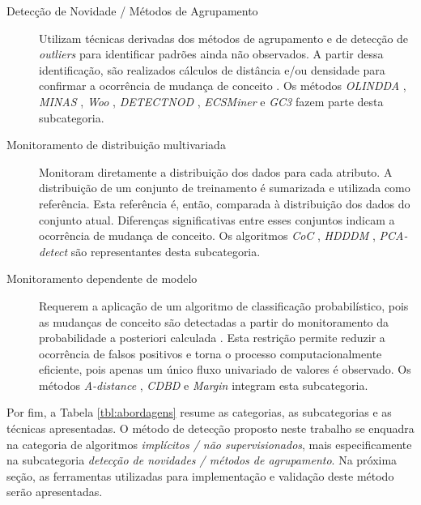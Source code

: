 \documentclass[qual, classic, a4paper]{ufbathesis}
\begin{document}
\begin{description}
    \item[Detecção de Novidade / Métodos de Agrupamento] 
    Utilizam técnicas derivadas dos métodos de agrupamento e de detecção de \textit{outliers} para identificar padrões ainda não observados.
    A partir dessa identificação, são realizados cálculos de distância e/ou densidade para confirmar a ocorrência de mudança de conceito \cite{Ryu:Kantardzic:2012}.
    Os métodos 
    \textit{OLINDDA} \cite{Spinosa:2007:OCA:1244002.1244107},
    \textit{MINAS} \cite{Faria:2013:NDA:2480362.2480515},
    \textit{Woo} \cite{Ryu:Kantardzic:2012},
    \textit{DETECTNOD} \cite{Hashemi:Hayat:DETECTNOD:2010},
    \textit{ECSMiner} \cite{Masud:2011:CNC:1978259.1978529} e
    \textit{GC3} \cite{Sethi2016b:GC3} fazem parte desta subcategoria.
    
    \item[Monitoramento de distribuição multivariada]
    Monitoram diretamente a distribuição dos dados para cada atributo.
    A distribuição de um conjunto de treinamento é sumarizada e utilizada como referência.
    Esta referência é, então, comparada à distribuição dos dados do conjunto atual.
    Diferenças significativas entre esses conjuntos indicam a ocorrência de mudança de conceito.
    Os algoritmos
    \textit{CoC} \cite{Lee:Magoules:CoC:2012},
    \textit{HDDDM} \cite{Ditzler:Polikar:HDDDM:2011},
    \textit{PCA-detect} \cite{Kuncheva:PCADetect:20085}
    são representantes desta subcategoria.

    \item[Monitoramento dependente de modelo]
    Requerem a aplicação de um algoritmo de classificação probabilístico, 
    pois as mudanças de conceito são detectadas a partir do monitoramento da probabilidade a posteriori calculada \cite{Zliobaite:2010}.
    Esta restrição permite reduzir a ocorrência de falsos positivos e torna o processo computacionalmente eficiente, pois apenas um único fluxo univariado de valores é observado. 
    Os métodos 
    \textit{A-distance} \cite{Dredze:ADistance:2010585},
    \textit{CDBD} \cite{Lindstrom:CDBD:2013} e
    \textit{Margin} \cite{Dries:Margin:2009} integram esta subcategoria.
\end{description}

Por fim, a Tabela \ref{tbl:abordagens} resume as categorias, as subcategorias e as técnicas apresentadas.
O método de detecção proposto neste trabalho se enquadra na categoria de algoritmos \textit{implícitos / não supervisionados}, mais especificamente na subcategoria \textit{detecção de novidades / métodos de agrupamento}.
Na próxima seção, as ferramentas utilizadas para implementação e validação deste método serão apresentadas.
\end{document}
